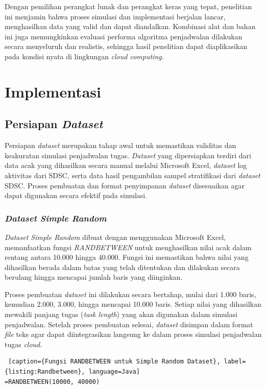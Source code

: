 Dengan pemilihan perangkat lunak dan perangkat keras yang tepat, penelitian ini menjamin bahwa proses simulasi dan implementasi berjalan lancar, menghasilkan data yang valid dan dapat diandalkan. Kombinasi alat dan bahan ini juga memungkinkan evaluasi performa algoritma penjadwalan dilakukan secara menyeluruh dan realistis, sehingga hasil penelitian dapat diaplikasikan pada kondisi nyata di lingkungan \textit{cloud computing}.

\section{Implementasi}
\subsection{Persiapan \textit{Dataset}}
Persiapan \textit{dataset} merupakan tahap awal untuk memastikan validitas dan keakuratan simulasi penjadwalan tugas. \textit{Dataset} yang dipersiapkan terdiri dari data acak yang dihasilkan secara manual melalui Microsoft Excel, \textit{dataset} log aktivitas dari SDSC, serta data hasil pengambilan sampel stratifikasi dari \textit{dataset} SDSC. Proses pembuatan dan format penyimpanan \textit{dataset} disesuaikan agar dapat digunakan secara efektif pada simulasi.

\subsubsection{\textit{Dataset Simple Random}}
\textit{Dataset Simple Random} dibuat dengan menggunakan Microsoft Excel, memanfaatkan fungsi \textit{RANDBETWEEN} untuk menghasilkan nilai acak dalam rentang antara 10.000 hingga 40.000. Fungsi ini memastikan bahwa nilai yang dihasilkan berada dalam batas yang telah ditentukan dan dilakukan secara berulang hingga mencapai jumlah baris yang diinginkan.

Proses pembuatan \textit{dataset} ini dilakukan secara bertahap, mulai dari 1.000 baris, kemudian 2.000, 3.000, hingga mencapai 10.000 baris. Setiap nilai yang dihasilkan mewakili panjang tugas (\textit{task length}) yang akan digunakan dalam simulasi penjadwalan. Setelah proses pembuatan selesai, \textit{dataset} disimpan dalam format \textit{file} teks agar dapat diintegrasikan langsung ke dalam proses simulasi penjadwalan tugas \textit{cloud}.

\begin{lstlisting} [caption={Fungsi RANDBETWEEN untuk Simple Random Dataset}, label={listing:Randbetween}, language=Java]
=RANDBETWEEN(10000, 40000)
\end{lstlisting}

